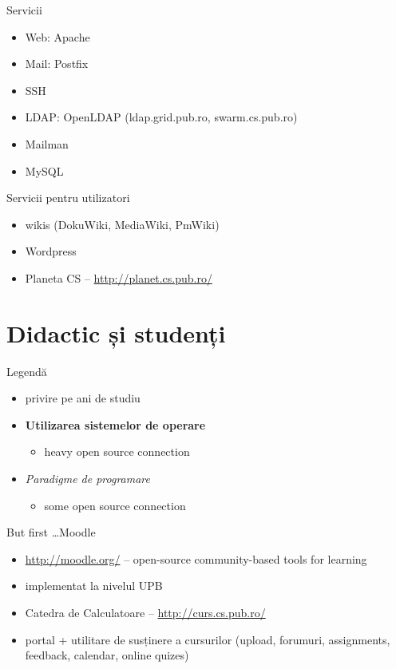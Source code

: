 \documentclass{beamer}
\begin{document}
\begin{frame}{Servicii}
	\begin{itemize}
		\item Web: Apache
		\item Mail: Postfix
		\item SSH
		\item LDAP: OpenLDAP (ldap.grid.pub.ro, swarm.cs.pub.ro)
		\item Mailman
		\item MySQL
	\end{itemize}
\end{frame}

\begin{frame}{Servicii pentru utilizatori}
	\begin{itemize}
		\item wikis (DokuWiki, MediaWiki, PmWiki)
		\item Wordpress
		\item Planeta CS -- \url{http://planet.cs.pub.ro/}
	\end{itemize}
\end{frame}

\section{Didactic și studenți}

\frame{\tableofcontents[currentsection]}

\begin{frame}{Legendă}
	\begin{itemize}
		\item privire pe ani de studiu
		\item \textbf{Utilizarea sistemelor de operare}
			\begin{itemize}
				\item heavy open source connection
			\end{itemize}
		\item \textit{Paradigme de programare}
			\begin{itemize}
				\item some open source connection
			\end{itemize}
	\end{itemize}
\end{frame}

\begin{frame}{But first \ldots Moodle}
	\begin{itemize}
		\item \url{http://moodle.org/} -- open-source community-based tools
		for learning
		\item implementat la nivelul UPB
		\item Catedra de Calculatoare -- \url{http://curs.cs.pub.ro/}
		\item portal + utilitare de susținere a cursurilor (upload, forumuri,
		assignments, feedback, calendar, online quizes)
	\end{itemize}
\end{frame}
\end{document}
